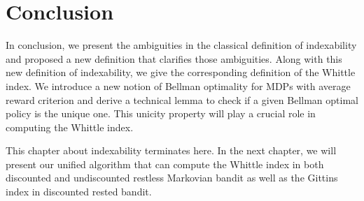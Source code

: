 \section{Conclusion}
\label{ch:idx:sec:conc}

In conclusion, we present the ambiguities in the classical definition of indexability and proposed a new definition that clarifies those ambiguities.
Along with this new definition of indexability, we give the corresponding definition of the Whittle index.
We introduce a new notion of Bellman optimality for MDPs with average reward criterion and derive a technical lemma to check if a given Bellman optimal policy is the unique one.
This unicity property will play a crucial role in computing the Whittle index.

This chapter about indexability terminates here.
In the next chapter, we will present our unified algorithm that can compute the Whittle index in both discounted and undiscounted restless Markovian bandit as well as the Gittins index in discounted rested bandit.

\endgroup
